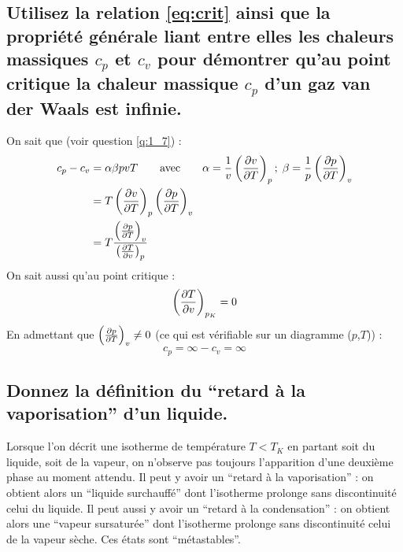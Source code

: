\subsection{Utilisez la relation \ref{eq:crit} ainsi que la propriété générale liant entre elles les chaleurs massiques $c_p$ et $c_v$ pour démontrer qu'au point critique la chaleur massique $c_p$ d'un gaz van der Waals est infinie.}
On sait que (voir question \ref{q:1_7}) :
\begin{align} c_p-c_v &= \alpha\beta pvT \qquad \text{avec} \qquad \alpha = \frac{1}{v}\left(\frac{\partial v}{\partial T}\right)_p ;\;\beta = \frac{1}{p}\left(\frac{\partial p}{\partial T}\right)_v \\ &= T\left(\frac{\partial v}{\partial T}\right)_p\left(\frac{\partial p}{\partial T}\right)_v \\ &= T\frac{\left(\frac{\partial p}{\partial T}\right)_v}{\left(\frac{\partial T}{\partial v}\right)_p} \end{align}
On sait aussi qu'au point critique :
\begin{equation} \left(\frac{\partial T}{\partial v}\right)_{p_K} = 0 \end{equation}
En admettant que $\left(\frac{\partial p}{\partial T}\right)_v \neq 0$ (ce qui est vérifiable sur un diagramme ($p$,$T$)) :
\begin{equation} c_p = \infty - c_v = \infty \end{equation}

\subsection{Donnez la définition du ``retard à la vaporisation'' d'un liquide.}
Lorsque l'on décrit une isotherme de température $T<T_K$ en partant soit du liquide, soit de la vapeur, on n'observe pas toujours l'apparition d'une deuxième phase au moment attendu. Il peut y avoir un ``retard à la vaporisation'' : on obtient alors un ``liquide surchauffé'' dont l'isotherme prolonge sans discontinuité celui du liquide. Il peut aussi y avoir un ``retard à la condensation'' : on obtient alors une ``vapeur sursaturée'' dont l'isotherme prolonge sans discontinuité celui de la vapeur sèche. Ces états sont ``métastables''.

